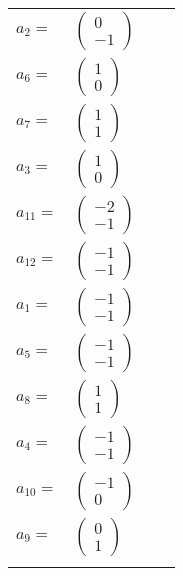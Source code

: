 \documentclass[1p]{elsarticle_modified}
\theoremstyle{definition}
\begin{document}
\begin{tabular}{m{7pt} m{180pt} m{7pt} m{180pt} }
\flushright $a_{2}=$&$\begin{pmatrix}0\\-1\end{pmatrix}$ \\
\flushright $a_{6}=$&$\begin{pmatrix}1\\0\end{pmatrix}$ \\
\flushright $a_{7}=$&$\begin{pmatrix}1\\1\end{pmatrix}$ \\
\flushright $a_{3}=$&$\begin{pmatrix}1\\0\end{pmatrix}$ \\
\flushright $a_{11}=$&$\begin{pmatrix}-2\\-1\end{pmatrix}$ \\
\flushright $a_{12}=$&$\begin{pmatrix}-1\\-1\end{pmatrix}$ \\
\flushright $a_{1}=$&$\begin{pmatrix}-1\\-1\end{pmatrix}$ \\
\flushright $a_{5}=$&$\begin{pmatrix}-1\\-1\end{pmatrix}$ \\
\flushright $a_{8}=$&$\begin{pmatrix}1\\1\end{pmatrix}$ \\
\flushright $a_{4}=$&$\begin{pmatrix}-1\\-1\end{pmatrix}$ \\
\flushright $a_{10}=$&$\begin{pmatrix}-1\\0\end{pmatrix}$ \\
\flushright $a_{9}=$&$\begin{pmatrix}0\\1\end{pmatrix}$\\&\end{tabular}
\end{document}
